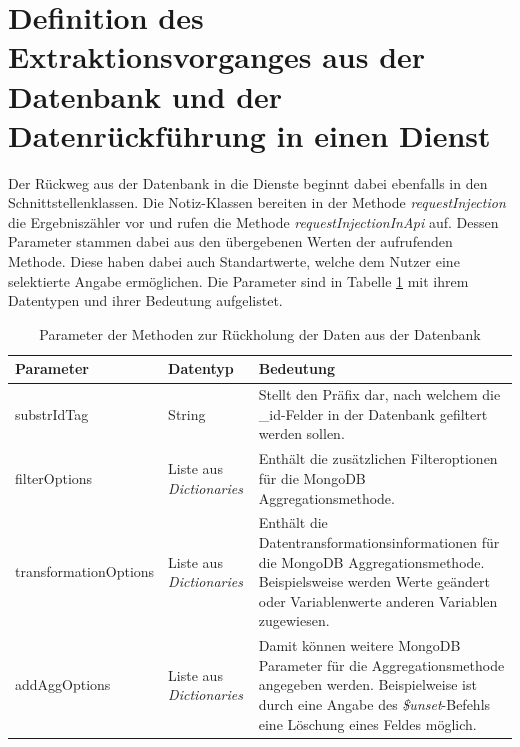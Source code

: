 \section{Definition des Extraktionsvorganges aus der Datenbank und der Datenrückführung in einen Dienst}

Der Rückweg aus der Datenbank in die Dienste beginnt dabei ebenfalls in den Schnittstellenklassen. Die Notiz-Klassen bereiten in der Methode \textit{requestInjection} die Ergebniszähler vor und rufen die Methode \textit{requestInjectionInApi} auf. Dessen Parameter stammen dabei aus den übergebenen Werten der aufrufenden Methode. Diese haben dabei auch Standartwerte, welche dem Nutzer eine selektierte Angabe ermöglichen. Die Parameter sind in Tabelle \ref{tab:params} mit ihrem Datentypen und ihrer Bedeutung aufgelistet.

\begin {table}[H]
\caption{Parameter der Methoden zur Rückholung der Daten aus der Datenbank}
\begin{tabular}{|l|l|p{6.2cm}|}
	\hline
	\textbf{Parameter} & \textbf{Datentyp} & \textbf{Bedeutung}\\
	\hline
	substrIdTag & String & Stellt den Präfix dar, nach welchem die \_id-Felder in der Datenbank gefiltert werden sollen. \\
	\hline
	filterOptions & Liste aus \textit{Dictionaries} & Enthält die zusätzlichen Filteroptionen für die MongoDB Aggregationsmethode.\\
	\hline
	transformationOptions & Liste aus \textit{Dictionaries} & Enthält die Datentransformationsinformationen für die MongoDB Aggregationsmethode. Beispielsweise werden Werte geändert oder Variablenwerte anderen Variablen zugewiesen.\\
	\hline
	addAggOptions & Liste aus \textit{Dictionaries} & Damit können weitere MongoDB Parameter für die Aggregationsmethode angegeben werden. Beispielweise ist durch eine Angabe des \textit{\$unset}-Befehls eine Löschung eines Feldes möglich.\\
	\hline
\end{tabular}
\label{tab:params}
\end{table}

